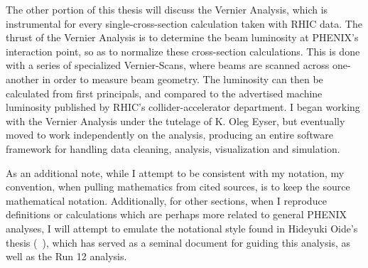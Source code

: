 The other portion of this thesis will discuss the Vernier Analysis, which is
instrumental for every single-cross-section calculation taken with RHIC data.
The thrust of the Vernier Analysis is to determine the beam luminosity at
PHENIX's interaction point, so as to normalize these cross-section calculations.
This is done with a series of specialized Vernier-Scans, where beams are scanned
across one-another in order to measure beam geometry. The luminosity can then be
calculated from first principals, and compared to the advertised machine
luminosity published by RHIC's collider-accelerator department. I began working
with the Vernier Analysis under the tutelage of K. Oleg Eyser, but eventually
moved to work independently on the analysis, producing an entire software
framework for handling data cleaning, analysis, visualization and simulation.

As an additional note, while I attempt to be consistent with my notation, my
convention, when pulling mathematics from cited sources, is to keep the source
mathematical notation. Additionally, for other sections, when I reproduce
definitions or calculations which are perhaps more related to general PHENIX
analyses, I will attempt to emulate the notational style found in Hideyuki
Oide's thesis (~\cite{Oide2012}), which has served as a seminal document for
guiding this analysis, as well as the Run 12 analysis.
